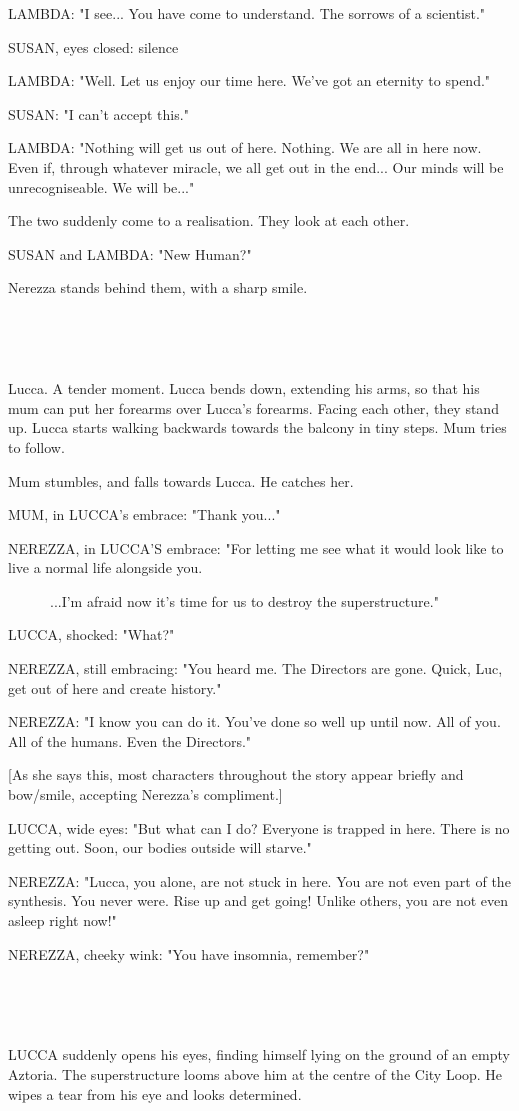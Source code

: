 \documentclass[11pt]{article}
\begin{document}
LAMBDA: "I see... You have come to understand.
The sorrows of a scientist."

SUSAN, eyes closed: silence

LAMBDA: "Well. 
Let us enjoy our time here. 
We've got an eternity to spend."

SUSAN: "I can't accept this."

LAMBDA: "Nothing will get us out of here. 
Nothing.
We are all in here now.
Even if, through whatever miracle, we all get out in the end...
Our minds will be unrecogniseable.
We will be..."

The two suddenly come to a realisation.
They look at each other.

SUSAN and LAMBDA: "New Human?"

Nerezza stands behind them, with a sharp smile.

\ 

\ 

Lucca.
A tender moment.
Lucca bends down, extending his arms, so that his mum can put her forearms over Lucca's forearms.
Facing each other, they stand up.
Lucca starts walking backwards towards the balcony in tiny steps.
Mum tries to follow.

Mum stumbles, and falls towards Lucca.
He catches her.

MUM, in LUCCA's embrace: "Thank you..."

NEREZZA, in LUCCA'S embrace: "For letting me see what it would look like to live a normal life alongside you.

\ \ \ \ \ \ ...I'm afraid now it's time for us to destroy the superstructure."

LUCCA, shocked: "What?"

NEREZZA, still embracing: "You heard me.
The Directors are gone.
Quick, Luc, get out of here and create history."

NEREZZA: "I know you can do it.
You've done so well up until now.
All of you.
All of the humans.
Even the Directors."

[As she says this, most characters throughout the story appear briefly and bow/smile, accepting Nerezza's compliment.]

LUCCA, wide eyes: "But what can I do? 
Everyone is trapped in here. 
There is no getting out.
Soon, our bodies outside will starve."

NEREZZA: "Lucca, you alone, are not stuck in here. 
You are not even part of the synthesis.
You never were. 
Rise up and get going!
Unlike others, you are not even asleep right now!"

NEREZZA, cheeky wink: "You have insomnia, remember?"

\ 

\ 

LUCCA suddenly opens his eyes, finding himself lying on the ground of an empty Aztoria.
The superstructure looms above him at the centre of the City Loop.
He wipes a tear from his eye and looks determined.
\end{document}

